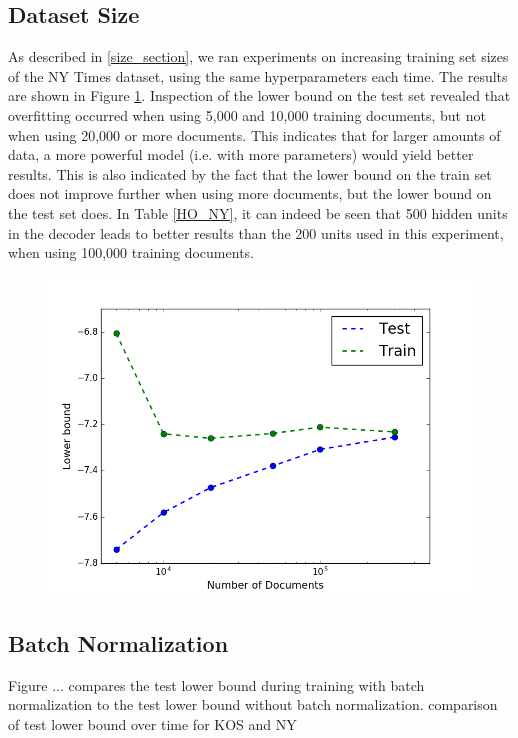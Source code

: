 \documentclass{report}
\begin{document}
	\subsection{Dataset Size}
	As described in \ref{size_section}, we ran experiments on increasing training set sizes of the NY Times dataset, using the same hyperparameters each time. The results are shown in Figure \ref{increase}. Inspection of the lower bound on the test set revealed that overfitting occurred when using 5,000 and 10,000 training documents, but not when using 20,000 or more documents. This indicates that for larger amounts of data, a more powerful model (i.e. with more parameters) would yield better results. This is also indicated by the fact that the lower bound on the train set does not improve further when using more documents, but the lower bound on the test set does. In Table \ref{HO_NY}, it can indeed be seen that 500 hidden units in the decoder  leads to better results than the 200 units used in this experiment, when using 100,000 training documents.
	
	
	\begin{figure}\label{increase}
		\includegraphics[scale=0.7]{img/increase.png}
	\end{figure}

	\subsection{Batch Normalization}
	Figure ... compares the test lower bound during training with batch normalization to the test lower bound without batch normalization. comparison of test lower bound over time for KOS and NY
	
\end{document}
